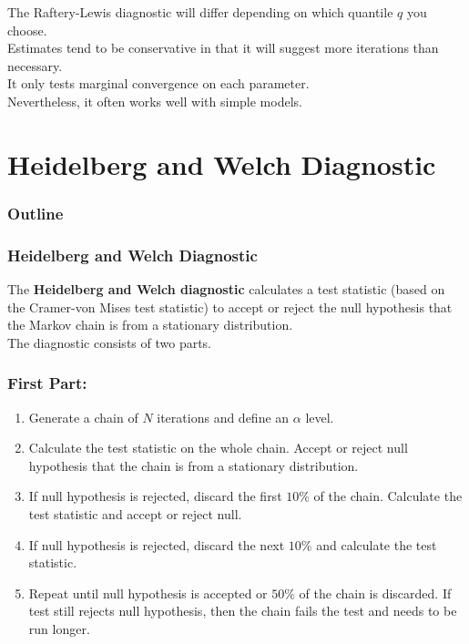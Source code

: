 \documentclass{beamer}
\begin{document}
\begin{frame}
The Raftery-Lewis diagnostic will differ depending on which quantile
$q$ you choose. \\
\pause
\bigskip
Estimates tend to be conservative in that it will suggest more
iterations than necessary. \\
\pause
\bigskip
It only tests marginal convergence on each parameter. \\
\pause
\bigskip
Nevertheless, it often works well with simple models.
\end{frame}

\section{Heidelberg and Welch Diagnostic}

\begin{frame}
\frametitle{Outline}
\tableofcontents[currentsection]
\end{frame}

\begin{frame}
\frametitle{Heidelberg and Welch Diagnostic}
\pause
The \textbf{Heidelberg and Welch diagnostic} calculates a test statistic
(based on the Cramer-von Mises test statistic) to accept or reject the
null hypothesis that the Markov chain is from a stationary distribution.\\
\pause
\bigskip
The diagnostic consists of two parts.
\end{frame}

\begin{frame}
\frametitle{First Part:}
\pause
\begin{enumerate}
\item Generate a chain of $N$ iterations and define an $\alpha$ level.
\pause
\item Calculate the test statistic on the whole chain.  Accept or
reject null hypothesis that the chain is from a stationary distribution.
\pause
\item If null hypothesis is rejected, discard the first $10\%$ of the
chain.  Calculate the test statistic and accept or reject null.
\pause
\item If null hypothesis is rejected, discard the next $10\%$ and
calculate the test statistic.  
\pause
\item Repeat until null hypothesis is accepted or $50\%$ of the chain
is discarded.  If test still rejects null hypothesis, then the chain
fails the test and needs to be run longer.
\end{enumerate}
\end{frame}
\end{document}
